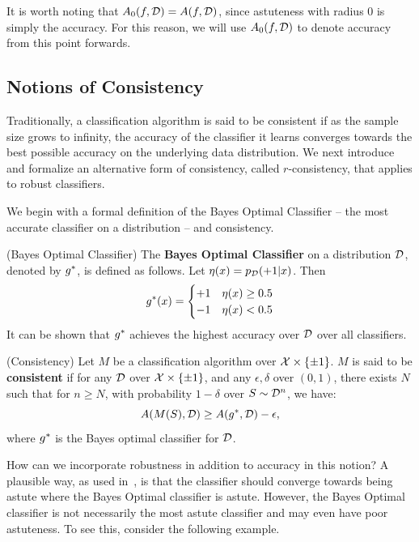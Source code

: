 It is worth noting that $A_0(f, {\mathcal D}) = A(f, {\mathcal D})$, since astuteness with radius $0$ is simply the accuracy. For this reason, we will use $A_0(f, {\mathcal D})$ to denote accuracy from this point forwards.

\subsection{Notions of Consistency}

Traditionally, a classification algorithm is said to be consistent if as the sample size grows to infinity, the accuracy of the classifier it learns converges towards the best possible accuracy on the underlying data distribution. We next introduce and formalize an alternative form of consistency, called $r$-consistency, that applies to robust classifiers.

We begin with a formal definition of the Bayes Optimal Classifier -- the most accurate classifier on a distribution -- and consistency. 

\begin{defn}
(Bayes Optimal Classifier) The \textbf{Bayes Optimal Classifier} on a distribution ${\mathcal D}$, denoted by $g^*$, is defined as follows. Let $\eta(x) = p_{\mathcal D}(+1|x)$. Then
 \[ g^*(x) = \begin{cases} 
      +1 & \eta(x) \geq 0.5 \\
      -1 & \eta(x) < 0.5 \\
   \end{cases}
\]
It can be shown that $g^*$ achieves the highest accuracy over ${\mathcal D}$ over all classifiers.
\end{defn}

\begin{defn}
(Consistency) Let $M$ be a classification algorithm  over $\mathcal X \times \{\pm 1\}$. $M$ is said to be \textbf{consistent} if for any ${\mathcal D}$ over $\mathcal X \times \{\pm 1\}$, and any $\epsilon, \delta$ over $(0,1)$, there exists $N$ such that for $n \geq N$, with probability $1-\delta$ over $S \sim {\mathcal D}^n$, we have: $$A(M(S), {\mathcal D}) \geq A(g^*, {\mathcal D}) - \epsilon,$$ where $g^*$ is the Bayes optimal classifier for ${\mathcal D}$. 
\end{defn}

How can we incorporate robustness in addition to accuracy in this notion? A plausible way, as used in~\cite{WJC18}, is that the classifier should converge towards being astute where the Bayes Optimal classifier is astute. However, the Bayes Optimal classifier is not necessarily the most astute classifier and may even have poor astuteness. To see this, consider the following example. 

